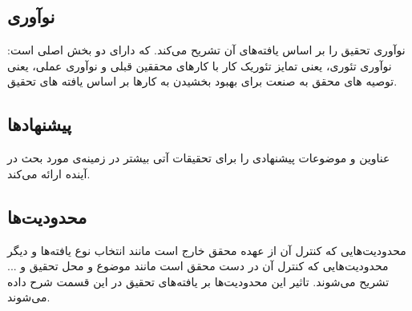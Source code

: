 \subsection{نوآوری}
نوآوری تحقیق را بر اساس یافته‌های آن تشریح می‌کند. که دارای دو بخش اصلی است: نوآوری
تئوری، یعنی تمایز تئوریک کار با کارهای محققین قبلی و نوآوری عملی، یعنی توصیه های محقق به
صنعت برای بهبود بخشیدن به کارها بر اساس یافته های تحقیق.

\subsection{پیشنهادها}
عناوین و موضوعات پیشنهادی را برای تحقیقات آتی بیشتر در زمینه‌ی مورد بحث در آینده ارائه می‌کند.


\subsection{محدودیت‌ها}
محدودیت‌هایی که کنترل آن از عهده محقق خارج است مانند انتخاب نوع یافته‌ها و دیگر محدودیت‌هایی که کنترل آن در دست محقق است مانند موضوع و محل تحقیق و ... تشریح می‌شوند. تاثیر این
محدودیت‌ها بر یافته‌های تحقیق در این قسمت شرح داده می‌شوند.